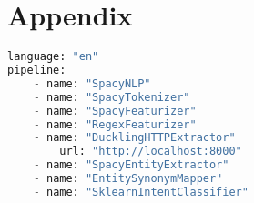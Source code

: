 


\makeFrontPage



\makeToc
    











\chapter{Appendix}
\begin{lstlisting}[caption={Detailed Pipeline Configuration for Rasa}, label={lst:spacy_pipeline_detail},captionpos=b,frame=single,language={Python},commentstyle=\color{mygreen},keywordstyle=\color{blue},
    morekeywords={language, pipeline, name}]                
language: "en"
pipeline:
    - name: "SpacyNLP"
    - name: "SpacyTokenizer"
    - name: "SpacyFeaturizer"
    - name: "RegexFeaturizer"
    - name: "DucklingHTTPExtractor"
        url: "http://localhost:8000"
    - name: "SpacyEntityExtractor"
    - name: "EntitySynonymMapper"
    - name: "SklearnIntentClassifier"
\end{lstlisting} 

